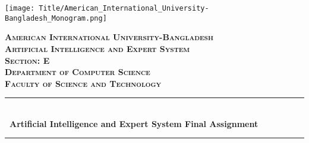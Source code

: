 \begin{titlepage}

\newcommand{\HRule}{\rule{\linewidth}{0.5mm}} %

\center
\texttt{[image: Title/American\_International\_University-Bangladesh\_Monogram.png]}\\[1cm] %
 

\center %


\textsc{\LARGE \textbf{American International University-Bangladesh}}\\[1.5cm] %
\textsc{\Large \textbf{Artificial Intelligence and Expert System}}\\[0.5cm] %
\textsc{\large \textbf{Section: E}}\\[0.5cm] %
\textsc{\large  \textbf{Department of Computer Science}}\\[0.5cm] %
\textsc{\large  \textbf{Faculty of Science and Technology}}\\[0.5cm] %

\makeatletter
\HRule \\[0.4cm]
{ \huge \bfseries \ Artificial Intelligence and Expert System Final Assignment}\\[0.4cm] %
\HRule \\[1.5cm]
 


\end{titlepage}
